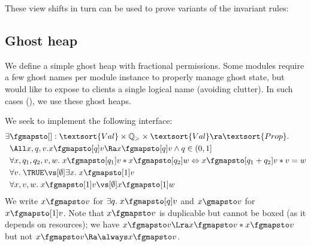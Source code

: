 These view shifts in turn can be used to prove variants of the invariant rules:


\subsection{Ghost heap}
\label{sec:ghostheap}%

We define a simple ghost heap with fractional permissions.
Some modules require a few ghost names per module instance to properly manage ghost state, but would like to expose to clients a single logical name (avoiding clutter).
In such cases (\eg {}), we use these ghost heaps.

We seek to implement the following interface:
\newcommand{\GRefspecmaps}{\textsf{GMapsTo}}%
\begin{align*}
 \exists& {\fgmapsto[]} : \textsort{Val} \times \mathbb{Q}_{>} \times \textsort{Val} \ra \textsort{Prop}.\;\\
  & \All x, q, v. x \fgmapsto[q] v \Ra x \fgmapsto[q] v \land q \in (0, 1] \\
  &\forall x, q_1, q_2, v, w.\; x \fgmapsto[q_1] v * x \fgmapsto[q_2] w \Leftrightarrow x \fgmapsto[q_1 + q_2] v * v = w\\
  & \forall v.\; \TRUE \vs[\emptyset] \exists x.\; x \fgmapsto[1] v \\
  & \forall x, v, w.\; x \fgmapsto[1] v \vs[\emptyset] x \fgmapsto[1] w
\end{align*}
We write $x \fgmapsto v$ for $\exists q.\; x \fgmapsto[q] v$ and $x \gmapsto v$ for $x \fgmapsto[1] v$.
Note that $x \fgmapsto v$ is duplicable but cannot be boxed (as it depends on resources); \ie we have $x \fgmapsto v \Lra x \fgmapsto v * x \fgmapsto v$ but not $x \fgmapsto v \Ra \always x \fgmapsto v$.

